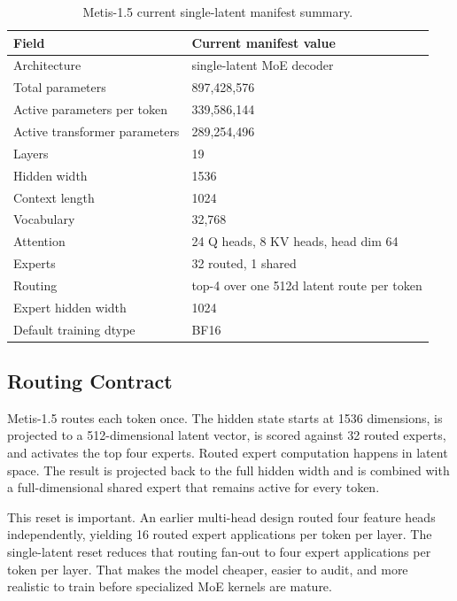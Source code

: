 \documentclass[11pt]{article}
\begin{document}
\begin{table}[h]
\centering
\begin{tabular}{ll}
\toprule
Field & Current manifest value \\
\midrule
Architecture & single-latent MoE decoder \\
Total parameters & 897,428,576 \\
Active parameters per token & 339,586,144 \\
Active transformer parameters & 289,254,496 \\
Layers & 19 \\
Hidden width & 1536 \\
Context length & 1024 \\
Vocabulary & 32,768 \\
Attention & 24 Q heads, 8 KV heads, head dim 64 \\
Experts & 32 routed, 1 shared \\
Routing & top-4 over one 512d latent route per token \\
Expert hidden width & 1024 \\
Default training dtype & BF16 \\
\bottomrule
\end{tabular}
\caption{Metis-1.5 current single-latent manifest summary.}
\label{tab:metis15_manifest}
\end{table}

\subsection{Routing Contract}

Metis-1.5 routes each token once. The hidden state starts at 1536 dimensions,
is projected to a 512-dimensional latent vector, is scored against 32 routed
experts, and activates the top four experts. Routed expert computation happens
in latent space. The result is projected back to the full hidden width and is
combined with a full-dimensional shared expert that remains active for every
token.

This reset is important. An earlier multi-head design routed four feature heads
independently, yielding 16 routed expert applications per token per layer. The
single-latent reset reduces that routing fan-out to four expert applications per
token per layer. That makes the model cheaper, easier to audit, and more
realistic to train before specialized MoE kernels are mature.
\end{document}

